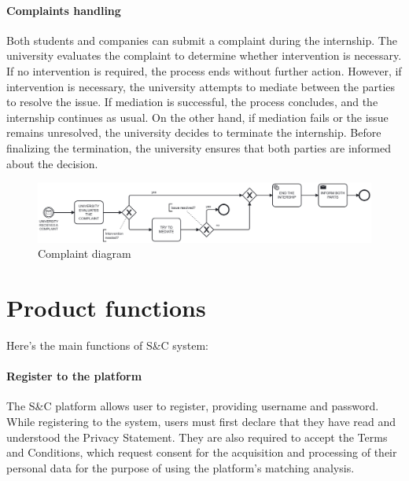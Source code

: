 \paragraph{Complaints handling} Both students and companies can submit a complaint during the internship. The university evaluates the complaint to determine whether intervention is necessary. If no intervention is required, the process ends without further action. However, if intervention is necessary, the university attempts to mediate between the parties to resolve the issue. If mediation is successful, the process concludes, and the internship continues as usual. On the other hand, if mediation fails or the issue remains unresolved, the university decides to terminate the internship. Before finalizing the termination, the university ensures that both parties are informed about the decision.

\begin{figure}[H]
    \centering
    \includegraphics[width=1\linewidth]{Images//state diagrams/COMPLAINTS.png}
    \caption{Complaint diagram}
    \label{fig:enter-label}
\end{figure}

\section{Product functions}
\label{sec:product_functions}%

Here's the main functions of S\&C system:

\paragraph{Register to the platform}
The S\&C platform allows user to register, providing username and password. While registering to the system, users must first declare that they have read and understood the Privacy Statement. They are also required to accept the Terms and Conditions, which request consent for the acquisition and processing of their personal data for the purpose of using the platform's matching analysis.

